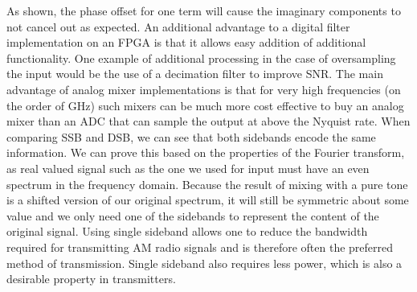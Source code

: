 \documentclass{article}
\begin{document}
  As shown, the phase offset for one term will cause the imaginary components to not cancel out as expected.  An additional advantage to a digital filter implementation on an FPGA is that it allows easy addition of additional functionality. One example of additional processing in the case of oversampling the input would be the use of a decimation filter to improve SNR. The main advantage of analog mixer implementations is that for very high frequencies (on the order of GHz) such mixers can be much more cost effective to buy an analog mixer than an ADC that can sample the output at above the Nyquist rate.
  When comparing SSB and DSB, we can see that both sidebands encode the same information.  We can prove this based on the properties of the Fourier transform, as real valued signal such as the one we used for input must have an even spectrum in the frequency domain.  Because the result of mixing with a pure tone is a shifted version of our original spectrum, it will still be symmetric about some value and we only need one of the sidebands to represent the content of the original signal.  Using single sideband allows one to reduce the bandwidth required for transmitting AM radio signals and is therefore often the preferred method of transmission. Single sideband also requires less power, which is also a desirable property in transmitters.
  
\end{document}
